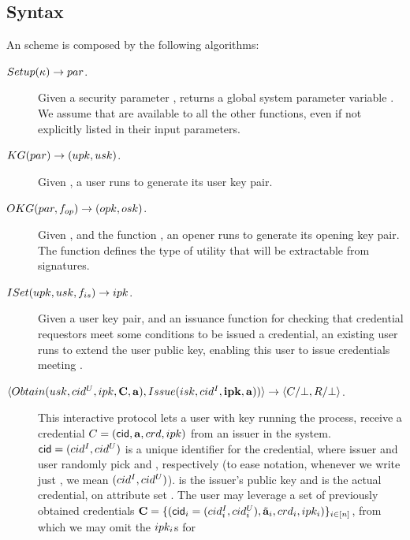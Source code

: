 
\subsection{Syntax}
\label{ssec:syntax-uas}

An \UAS scheme is composed by the following algorithms:

\begin{description}
\item[$Setup(\kappa) \rightarrow par$.] Given a security parameter \secpar,
  returns a global system parameter variable \parm. We assume that \parm are
  available to all the other functions, even if not explicitly listed in their
  input parameters.
\item[$KG(par) \rightarrow (upk,usk)$.] Given \parm, a user runs
  \KeyGen to generate its user key pair. 
\item[$OKG(par,f_{op}) \rightarrow (opk,osk)$.] Given \parm, and the
  function \finsp, an opener runs \OKeyGen to generate its opening key pair.
  The function \finsp defines the type of utility that will be extractable from
  signatures.
\item[$ISet(upk,usk,f_{is}) \rightarrow ipk$.] Given a user key
  pair, and an issuance function \fissue for checking that credential requestors
  meet some conditions to be issued a credential, an existing user runs \ISet to
  extend the user public key, enabling this user to issue credentials meeting
  \fissue.
\item[$\langle
  Obtain(usk,cid^U,ipk,\mathbf{C},\mathbf{a}),
  Issue(isk,cid^I,\mathbf{ipk},\mathbf{a}))  
  \rangle \rightarrow \langle C/\bot,R/\bot
  \rangle$.] %
  This interactive protocol lets a user with key \usk running the \Obtain
  process, receive a credential $C=(\mathsf{cid},\mathbf{a},crd,ipk)$
  from an issuer in the system. $\mathsf{cid}=(cid^I,cid^U)$ is a unique identifier for
  the credential, where issuer and user randomly pick \cidi and \cidu,
  respectively (to ease notation, whenever we write just \cid, we mean $(cid^I,
  cid^U)$). \ipk is the issuer's public key and \cred is the actual credential,
  on attribute set \attrs. The user may leverage a set of previously obtained
  credentials $\mathbf{C}=\lbrace (\mathsf{cid}_i=(cid^I_i,cid^U_i),\tilde{\mathbf{a}}_i,crd_i,
  ipk_i)\rbrace_{i\in[n]}$, from which we may omit the $ipk_i$s for

\end{description}
